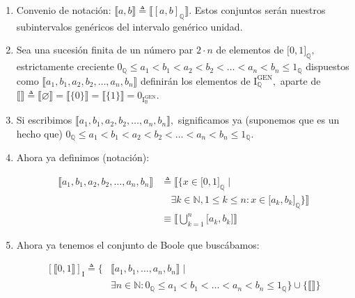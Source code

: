 \begin{enumerate}
\begin{enumerate}
      \[\begin{matrix}
      ⟦A⟧, ⟦B⟧ \in \mathbf{\mathrm{I}}_{\mathbb{Q}}^{\mathbf{\mathrm{GEN}}} \\
      ⟦A⟧ + ⟦B⟧ \triangleq ⟦A \cup B⟧ \\
      ⟦A⟧ \cdot ⟦B⟧ \triangleq ⟦A \cap B⟧ \\
      \overline{⟦A⟧} \triangleq ⟦\lbrack 0,1\rbrack_{\mathbb{Q}} \smallsetminus A⟧
      \end{matrix}\]
    \item
      Convenio de
      notación: $⟦a,b⟧ \triangleq ⟦\left\lbrack a,b \right\rbrack_{\mathbb{Q}}⟧.$
      Estos conjuntos serán nuestros subintervalos genéricos del
      intervalo genérico unidad.
    \item
      Sea una sucesión finita de un número par $2 \cdot n$ de
      elementos de $\lbrack 0,1\rbrack_{\mathbb{Q}},$ estrictamente
      creciente
      $0_{\mathbb{Q}} \leq a_{1} < b_{1} < a_{2} < b_{2} < \ldots < a_{n} < b_{n} \leq 1_{\mathbb{Q}}$
      dispuestos como
      $⟦a_{1},b_{1},a_{2},b_{2},\ldots,a_{n},b_{n}⟧$ definirán los
      elementos de
      $\mathbf{\mathrm{I}}_{\mathbb{Q}}^{\mathbf{\mathrm{GEN}}},$
      aparte de
      $⟦⟧ \triangleq ⟦\varnothing⟧ = ⟦\{0\}⟧ = ⟦\{1\}⟧ = 0_{\mathbf{\mathrm{I}}_{\mathbb{B}}^{\mathbf{\mathrm{GEN}}}}.$
    \item
      Si escribimos $⟦a_{1},b_{1},a_{2},b_{2},\ldots,a_{n},b_{n}⟧,$
      significamos ya (suponemos que es un hecho que)
      $0_{\mathbb{Q}} \leq a_{1} < b_{1} < a_{2} < b_{2} < \ldots < a_{n} < b_{n} \leq 1_{\mathbb{Q}}.$
    \item
      Ahora ya definimos (notación):

      \[\begin{aligned}
      ⟦a_{1},b_{1},a_{2},b_{2},\ldots,a_{n},b_{n}⟧ &\triangleq ⟦\{x \in \lbrack 0,1\rbrack_{\mathbb{Q}} \mid \\
      &\quad \exists k \in \mathbb{N}, 1 \leq k \leq n : x \in \lbrack a_{k},b_{k}\rbrack_{\mathbb{Q}}\}⟧ \\
      &\equiv ⟦\bigcup_{k = 1}^{n}\lbrack a_{k},b_{k}\rbrack⟧
      \end{aligned}\]
    \item
      Ahora ya tenemos el conjunto de Boole que buscábamos:

      \[\begin{aligned}
      \left\lbrack ⟦0,1⟧ \right\rbrack_{\mathbf{\mathrm{I}}} \triangleq \{ &⟦a_{1},b_{1},\ldots,a_{n},b_{n}⟧ \mid \\
      &\exists n \in \mathbb{N} : 0_{\mathbb{Q}} \leq a_{1} < b_{1} < \ldots < a_{n} < b_{n} \leq 1_{\mathbb{Q}} \} \cup \{ ⟦⟧ \}
      \end{aligned}\]
    \end{enumerate}
  \end{enumerate}

